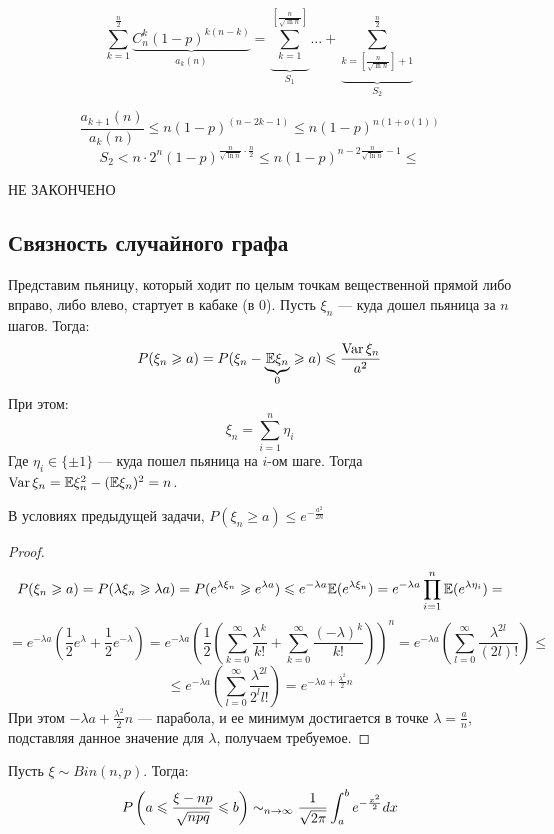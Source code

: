 

\[\sum_{k=1}^\frac{n}{2} \underbrace{C_n^k (1-p)^{k(n-k)}}_{a_k(n)} = \underbrace{\sum_{k=1}^{[\frac{n}{\sqrt{\ln{n}}}]}}_{S_1} \dots + \underbrace{\sum_{k = [\frac{n}{\sqrt{\ln{n}}}] + 1}^{\frac{n}{2}}}_{S_2}\]

\[\frac{a_{k+1}(n)}{a_k(n)} \le n (1-p)^{(n-2k-1)} \le n(1-p)^{n(1 + o(1))}\]
\[S_2 < n \cdot 2^n (1 - p)^{\frac{n}{\sqrt{\ln{n}}} \cdot \frac{n}{2}} \le n(1 - p)^{n - 2\frac{n}{\sqrt{\ln{n}}} - 1}  \le \]

НЕ ЗАКОНЧЕНО

\subsection{Связность случайного графа}

Представим пьяницу, который ходит по целым точкам вещественной прямой либо вправо, либо влево, стартует в кабаке (в 0). Пусть \(\xi_n\) --- куда дошел пьяница за \(n\) шагов. Тогда:
\[P(\xi_n \geqslant a) = P(\xi_n - \underbrace{\mathbb{E} \xi_n}_{0} \geqslant a) \leqslant \frac{\operatorname{Var} \xi_n}{a^2}\]
При этом:
\[\xi_n = \sum_{i = 1}^n \eta_i\]
Где \(\eta_i \in \{\pm 1\}\) --- куда пошел пьяница на \(i\)-ом шаге. Тогда \(\operatorname{Var} \xi_n = \mathbb{E}\xi_n^2 - (\mathbb{E}\xi_n)^2 = n\).

\begin{proposition}
    В условиях предыдущей задачи, \(P(\xi_n \ge a) \le e^{-\frac{a^2}{2n}}\)
\end{proposition}
\begin{proof}
    \[P(\xi_n \geqslant a) = P(\lambda\xi_n \geqslant \lambda a) = P(e^{\lambda \xi_n} \geqslant e^{\lambda a}) \leqslant e^{-\lambda a}\mathbb{E} (e^{\lambda \xi_n}) = e^{-\lambda a} \prod_{i = 1}^n \mathbb{E} (e^{\lambda \eta_i}) = \]
    \[= e^{-\lambda a} \left( \frac{1}{2}e^\lambda + \frac{1}{2}e^{-\lambda} \right) = e^{-\lambda a}\left( \frac{1}{2}\left( \sum_{k = 0}^\infty \frac{\lambda^k}{k!} + \sum_{k = 0}^\infty \frac{(-\lambda)^k}{k!} \right) \right)^n = e^{-\lambda a} \left( \sum_{l = 0}^\infty \frac{\lambda^{2l}}{(2l)!} \right) \le \]
    \[\le e^{-\lambda a} \left( \sum_{l = 0}^\infty \frac{\lambda^{2l}}{2^ll!} \right) = e^{-\lambda a + \frac{\lambda^2}{2}n}\]
    При этом \(-\lambda a + \frac{\lambda^2}{2}n\) --- парабола, и ее минимум достигается в точке \(\lambda = \frac{a}{n}\), подставляя данное значение для \(\lambda\), получаем требуемое.
\end{proof}

\begin{theorem}
    Пусть \(\xi \sim Bin(n, p)\). Тогда:
    \[P\left( a \leqslant \frac{\xi - n p}{\sqrt{npq}} \leqslant b\right) \sim_{n \rightarrow \infty} \frac{1}{\sqrt{2\pi}} \int_a^b e^{-\frac{x^2}{2}}dx\]
\end{theorem}


